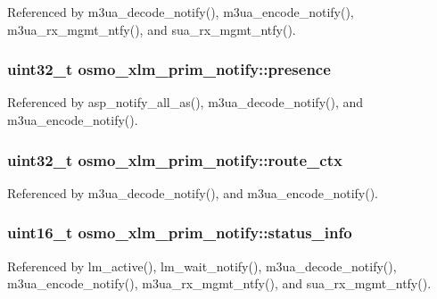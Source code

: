 Referenced by m3ua\+\_\+decode\+\_\+notify(), m3ua\+\_\+encode\+\_\+notify(), m3ua\+\_\+rx\+\_\+mgmt\+\_\+ntfy(), and sua\+\_\+rx\+\_\+mgmt\+\_\+ntfy().

\subsubsection[{presence}]{\setlength{\rightskip}{0pt plus 5cm}uint32\+\_\+t osmo\+\_\+xlm\+\_\+prim\+\_\+notify\+::presence}\label{structosmo__xlm__prim__notify_adc209ee1e3adfaf914cb212eb5612a96}


Referenced by asp\+\_\+notify\+\_\+all\+\_\+as(), m3ua\+\_\+decode\+\_\+notify(), and m3ua\+\_\+encode\+\_\+notify().

\subsubsection[{route\+\_\+ctx}]{\setlength{\rightskip}{0pt plus 5cm}uint32\+\_\+t osmo\+\_\+xlm\+\_\+prim\+\_\+notify\+::route\+\_\+ctx}\label{structosmo__xlm__prim__notify_aa0e3ecc46eaa10ddf1dfeb3c3f2efccb}


Referenced by m3ua\+\_\+decode\+\_\+notify(), and m3ua\+\_\+encode\+\_\+notify().

\subsubsection[{status\+\_\+info}]{\setlength{\rightskip}{0pt plus 5cm}uint16\+\_\+t osmo\+\_\+xlm\+\_\+prim\+\_\+notify\+::status\+\_\+info}\label{structosmo__xlm__prim__notify_a3de43c2ff5cd951a6c24d7d0ea259f38}


Referenced by lm\+\_\+active(), lm\+\_\+wait\+\_\+notify(), m3ua\+\_\+decode\+\_\+notify(), m3ua\+\_\+encode\+\_\+notify(), m3ua\+\_\+rx\+\_\+mgmt\+\_\+ntfy(), and sua\+\_\+rx\+\_\+mgmt\+\_\+ntfy().

